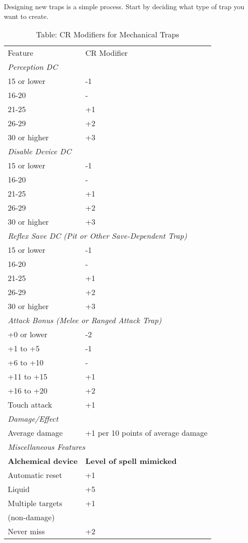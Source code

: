 				
Designing new traps is a simple process. Start by deciding what type of trap you want to create.
\begin{table}[]
\sffamily
\caption{Table: CR Modifiers for Mechanical Traps}
\begin{tabular}{ll}
Feature & CR Modifier\\
\multicolumn{2}{l}{\textit{Perception DC}}\\
15 or lower & -1\\
16-20 & -\\
21-25 & +1\\
26-29 & +2\\
30 or higher & +3\\
\multicolumn{2}{l}{\textit{Disable Device DC}}\\
15 or lower & -1\\
16-20 & -\\
21-25 & +1\\
26-29 & +2\\
30 or higher & +3\\
\multicolumn{2}{l}{\textit{Reflex Save DC (Pit or Other Save-Dependent Trap)}}\\
15 or lower & -1\\
16-20 & -\\
21-25 & +1\\
26-29 & +2\\
30 or higher & +3\\
\multicolumn{2}{l}{\textit{Attack Bonus (Melee or Ranged Attack Trap)}}\\
+0 or lower & -2\\
+1 to +5 & -1\\
+6 to +10 & -\\
+11 to +15 & +1\\
+16 to +20 & +2\\
Touch attack & +1\\
\multicolumn{2}{l}{\textit{Damage/Effect}}\\
Average damage & +1 per 10 points of average damage\\
\multicolumn{2}{l}{\textit{Miscellaneous Features}}\\
\textbf{Alchemical device} & \textbf{Level of spell mimicked}\\
Automatic reset & +1\\
Liquid & +5\\
Multiple targets & +1\\
 (non-damage) &  \\
Never miss & +2\\

\end{tabular}
\end{table}
